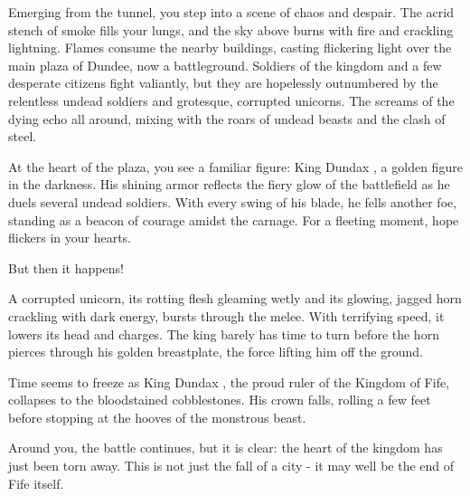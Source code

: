 \begin{DndReadAloud}
	Emerging from the tunnel, you step into a scene of chaos and despair. The acrid stench of smoke fills your lungs, and the sky above burns with fire and crackling lightning. Flames consume the nearby buildings, casting flickering light over the main plaza of Dundee, now a battleground. Soldiers of the kingdom and a few desperate citizens fight valiantly, but they are hopelessly outnumbered by the relentless undead soldiers and grotesque, corrupted unicorns. The screams of the dying echo all around, mixing with the roars of undead beasts and the clash of steel.
	
	At the heart of the plaza, you see a familiar figure: King Dundax , a golden figure in the darkness. His shining armor reflects the fiery glow of the battlefield as he duels several undead soldiers. With every swing of his blade, he fells another foe, standing as a beacon of courage amidst the carnage. For a fleeting moment, hope flickers in your hearts.
	
	But then it happens!

	A corrupted unicorn, its rotting flesh gleaming wetly and its glowing, jagged horn crackling with dark energy, bursts through the melee. With terrifying speed, it lowers its head and charges. The king barely has time to turn before the horn pierces through his golden breastplate, the force lifting him off the ground.

	Time seems to freeze as King Dundax , the proud ruler of the Kingdom of Fife, collapses to the bloodstained cobblestones. His crown falls, rolling a few feet before stopping at the hooves of the monstrous beast.

	Around you, the battle continues, but it is clear: the heart of the kingdom has just been torn away. This is not just the fall of a city - it may well be the end of Fife itself.
\end{DndReadAloud}

